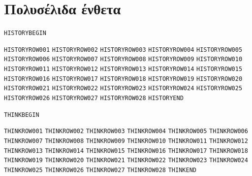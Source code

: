 \section{Πολυσέλιδα ένθετα}
\clearpage
\begin{HistoryBox}
\texttt{HISTORYBEGIN}\par
\texttt{HISTORYROW001}\quad\StressParagraph
\texttt{HISTORYROW002}\quad\StressParagraph
\texttt{HISTORYROW003}\quad\StressParagraph
\texttt{HISTORYROW004}\quad\StressParagraph
\texttt{HISTORYROW005}\quad\StressParagraph
\texttt{HISTORYROW006}\quad\StressParagraph
\texttt{HISTORYROW007}\quad\StressParagraph
\texttt{HISTORYROW008}\quad\StressParagraph
\texttt{HISTORYROW009}\quad\StressParagraph
\texttt{HISTORYROW010}\quad\StressParagraph
\texttt{HISTORYROW011}\quad\StressParagraph
\texttt{HISTORYROW012}\quad\StressParagraph
\texttt{HISTORYROW013}\quad\StressParagraph
\texttt{HISTORYROW014}\quad\StressParagraph
\texttt{HISTORYROW015}\quad\StressParagraph
\texttt{HISTORYROW016}\quad\StressParagraph
\texttt{HISTORYROW017}\quad\StressParagraph
\texttt{HISTORYROW018}\quad\StressParagraph
\texttt{HISTORYROW019}\quad\StressParagraph
\texttt{HISTORYROW020}\quad\StressParagraph
\texttt{HISTORYROW021}\quad\StressParagraph
\texttt{HISTORYROW022}\quad\StressParagraph
\texttt{HISTORYROW023}\quad\StressParagraph
\texttt{HISTORYROW024}\quad\StressParagraph
\texttt{HISTORYROW025}\quad\StressParagraph
\texttt{HISTORYROW026}\quad\StressParagraph
\texttt{HISTORYROW027}\quad\StressParagraph
\texttt{HISTORYROW028}\quad\StressParagraph
\texttt{HISTORYEND}
\end{HistoryBox}
\clearpage
\begin{ThinkBox}
\texttt{THINKBEGIN}\par
\texttt{THINKROW001}\quad\StressParagraph
\texttt{THINKROW002}\quad\StressParagraph
\texttt{THINKROW003}\quad\StressParagraph
\texttt{THINKROW004}\quad\StressParagraph
\texttt{THINKROW005}\quad\StressParagraph
\texttt{THINKROW006}\quad\StressParagraph
\texttt{THINKROW007}\quad\StressParagraph
\texttt{THINKROW008}\quad\StressParagraph
\texttt{THINKROW009}\quad\StressParagraph
\texttt{THINKROW010}\quad\StressParagraph
\texttt{THINKROW011}\quad\StressParagraph
\texttt{THINKROW012}\quad\StressParagraph
\texttt{THINKROW013}\quad\StressParagraph
\texttt{THINKROW014}\quad\StressParagraph
\texttt{THINKROW015}\quad\StressParagraph
\texttt{THINKROW016}\quad\StressParagraph
\texttt{THINKROW017}\quad\StressParagraph
\texttt{THINKROW018}\quad\StressParagraph
\texttt{THINKROW019}\quad\StressParagraph
\texttt{THINKROW020}\quad\StressParagraph
\texttt{THINKROW021}\quad\StressParagraph
\texttt{THINKROW022}\quad\StressParagraph
\texttt{THINKROW023}\quad\StressParagraph
\texttt{THINKROW024}\quad\StressParagraph
\texttt{THINKROW025}\quad\StressParagraph
\texttt{THINKROW026}\quad\StressParagraph
\texttt{THINKROW027}\quad\StressParagraph
\texttt{THINKROW028}\quad\StressParagraph
\texttt{THINKEND}
\end{ThinkBox}
